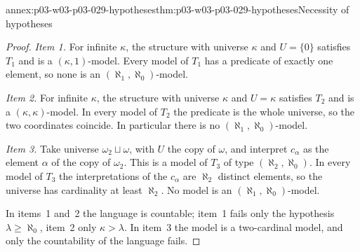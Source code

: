 \begin{annexitem}{annex:p03-w03-p03-029-hypotheses}{thm:p03-w03-p03-029-hypotheses}{Necessity of hypotheses}
\begin{proof}
\emph{Item 1.} For infinite \(\kappa\), the structure with universe \(\kappa\)
and \(U=\{0\}\) satisfies \(T_1\) and is a \((\kappa,1)\)-model. Every model
of \(T_1\) has a predicate of exactly one element, so none is an
\((\aleph_1,\aleph_0)\)-model.

\emph{Item 2.} For infinite \(\kappa\), the structure with universe \(\kappa\)
and \(U=\kappa\) satisfies \(T_2\) and is a \((\kappa,\kappa)\)-model. In
every model of \(T_2\) the predicate is the whole universe, so the two
coordinates coincide. In particular there is no
\((\aleph_1,\aleph_0)\)-model.

\emph{Item 3.} Take universe \(\omega_2\sqcup\omega\), with \(U\) the copy
of \(\omega\), and interpret \(c_\alpha\) as the element \(\alpha\) of the
copy of \(\omega_2\). This is a model of \(T_3\) of type
\((\aleph_2,\aleph_0)\). In every model of \(T_3\) the interpretations of
the \(c_\alpha\) are \(\aleph_2\) distinct elements, so the universe has
cardinality at least \(\aleph_2\). No model is an
\((\aleph_1,\aleph_0)\)-model.

In items~1 and~2 the language is countable; item~1 fails only the
hypothesis \(\lambda\geq\aleph_0\), item~2 only \(\kappa>\lambda\).
In item~3 the model is a two-cardinal model, and only the
countability of the language fails.
\end{proof}
\end{annexitem}

